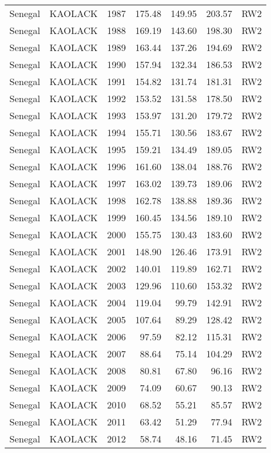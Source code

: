 \begin{longtable}{lllrrrl}
  Senegal & KAOLACK & 1987 & 175.48 & 149.95 & 203.57 & RW2 \\ 
  Senegal & KAOLACK & 1988 & 169.19 & 143.60 & 198.30 & RW2 \\ 
  Senegal & KAOLACK & 1989 & 163.44 & 137.26 & 194.69 & RW2 \\ 
  Senegal & KAOLACK & 1990 & 157.94 & 132.34 & 186.53 & RW2 \\ 
  Senegal & KAOLACK & 1991 & 154.82 & 131.74 & 181.31 & RW2 \\ 
  Senegal & KAOLACK & 1992 & 153.52 & 131.58 & 178.50 & RW2 \\ 
  Senegal & KAOLACK & 1993 & 153.97 & 131.20 & 179.72 & RW2 \\ 
  Senegal & KAOLACK & 1994 & 155.71 & 130.56 & 183.67 & RW2 \\ 
  Senegal & KAOLACK & 1995 & 159.21 & 134.49 & 189.05 & RW2 \\ 
  Senegal & KAOLACK & 1996 & 161.60 & 138.04 & 188.76 & RW2 \\ 
  Senegal & KAOLACK & 1997 & 163.02 & 139.73 & 189.06 & RW2 \\ 
  Senegal & KAOLACK & 1998 & 162.78 & 138.88 & 189.36 & RW2 \\ 
  Senegal & KAOLACK & 1999 & 160.45 & 134.56 & 189.10 & RW2 \\ 
  Senegal & KAOLACK & 2000 & 155.75 & 130.43 & 183.60 & RW2 \\ 
  Senegal & KAOLACK & 2001 & 148.90 & 126.46 & 173.91 & RW2 \\ 
  Senegal & KAOLACK & 2002 & 140.01 & 119.89 & 162.71 & RW2 \\ 
  Senegal & KAOLACK & 2003 & 129.96 & 110.60 & 153.32 & RW2 \\ 
  Senegal & KAOLACK & 2004 & 119.04 & 99.79 & 142.91 & RW2 \\ 
  Senegal & KAOLACK & 2005 & 107.64 & 89.29 & 128.42 & RW2 \\ 
  Senegal & KAOLACK & 2006 & 97.59 & 82.12 & 115.31 & RW2 \\ 
  Senegal & KAOLACK & 2007 & 88.64 & 75.14 & 104.29 & RW2 \\ 
  Senegal & KAOLACK & 2008 & 80.81 & 67.80 & 96.16 & RW2 \\ 
  Senegal & KAOLACK & 2009 & 74.09 & 60.67 & 90.13 & RW2 \\ 
  Senegal & KAOLACK & 2010 & 68.52 & 55.21 & 85.57 & RW2 \\ 
  Senegal & KAOLACK & 2011 & 63.42 & 51.29 & 77.94 & RW2 \\ 
  Senegal & KAOLACK & 2012 & 58.74 & 48.16 & 71.45 & RW2 \\ 

\end{longtable}
